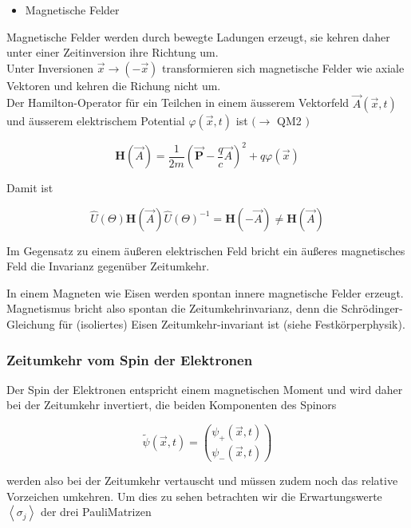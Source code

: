 \documentclass[10pt, letterpaper]{article}
\begin{document}
\begin{itemize}
  \item Magnetische Felder
\end{itemize}

Magnetische Felder werden durch bewegte Ladungen erzeugt, sie kehren daher unter einer Zeitinversion ihre Richtung um.\\
Unter Inversionen $\vec{x} \rightarrow(-\vec{x})$ transformieren sich magnetische Felder wie axiale Vektoren und kehren die Richung nicht um.\\
Der Hamilton-Operator für ein Teilchen in einem äusserem Vektorfeld $\vec{A}(\vec{x}, t)$ und äusserem elektrischem Potential $\varphi(\vec{x}, t)$ ist $(\rightarrow$ QM2 $)$

$$
\mathbf{H}(\vec{A})=\frac{1}{2 m}\left(\overrightarrow{\mathbf{P}}-\frac{q}{c} \vec{A}\right)^{2}+q \varphi(\vec{x})
$$

Damit ist

$$
\widehat{U}(\Theta) \mathbf{H}(\vec{A}) \widehat{U}(\Theta)^{-1}=\mathbf{H}(-\vec{A}) \neq \mathbf{H}(\vec{A})
$$

Im Gegensatz zu einem äußeren elektrischen Feld bricht ein äußeres magnetisches Feld die Invarianz gegenüber Zeitumkehr.

In einem Magneten wie Eisen werden spontan innere magnetische Felder erzeugt. Magnetismus bricht also spontan die Zeitumkehrinvarianz, denn die Schrödinger-Gleichung für (isoliertes) Eisen Zeitumkehr-invariant ist (siehe Festkörperphysik).

\subsubsection*{Zeitumkehr vom Spin der Elektronen}
Der Spin der Elektronen entspricht einem magnetischen Moment und wird daher bei der Zeitumkehr invertiert, die beiden Komponenten des Spinors

$$
\widetilde{\psi}(\vec{x}, t)=\binom{\psi_{+}(\vec{x}, t)}{\psi_{-}(\vec{x}, t)}
$$

werden also bei der Zeitumkehr vertauscht und müssen zudem noch das relative Vorzeichen umkehren. Um dies zu sehen betrachten wir die Erwartungswerte $\left\langle\sigma_{j}\right\rangle$ der drei PauliMatrizen
\end{document}

